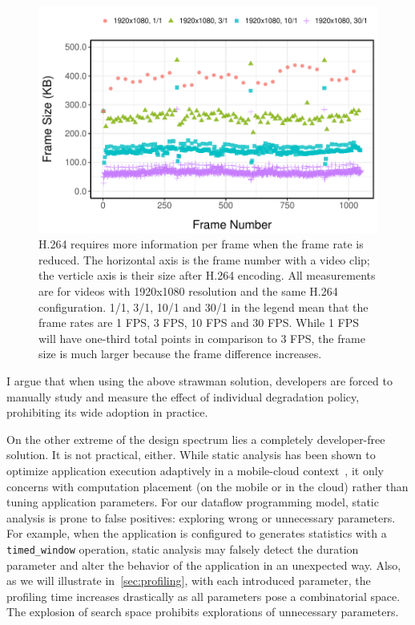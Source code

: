 \begin{figure}
  \centering
  \includegraphics[width=0.8\columnwidth]{figures/h264.pdf}
  \caption{H.264 requires more information per frame when the frame rate is
    reduced. The horizontal axis is the frame number with a video clip; the
    verticle axis is their size after H.264 encoding. All measurements are for
    videos with 1920x1080 resolution and the same H.264 configuration. 1/1, 3/1,
    10/1 and 30/1 in the legend mean that the frame rates are 1 FPS, 3 FPS, 10
    FPS and 30 FPS. While 1 FPS will have one-third total points in comparison
    to 3 FPS, the frame size is much larger because the frame difference
    increases. }
  \label{fig:h264}
\end{figure}

\vspace{0.5em}

I argue that when using the above strawman solution, developers are forced to
manually study and measure the effect of individual degradation policy,
prohibiting its wide adoption in practice.

On the other extreme of the design spectrum lies a completely developer-free
solution. It is not practical, either. While static analysis has been shown to
optimize application execution adaptively in a mobile-cloud
context~\cite{chun2011clonecloud}, it only concerns with computation placement
(on the mobile or in the cloud) rather than tuning application parameters.  For
our dataflow programming model, static analysis is prone to false positives:
exploring wrong or unnecessary parameters. For example, when the application is
configured to generates statistics with a \texttt{timed\_window} operation,
static analysis may falsely detect the duration parameter and alter the behavior
of the application in an unexpected way. Also, as we will illustrate
in~\autoref{sec:profiling}, with each introduced parameter, the profiling time
increases drastically as all parameters pose a combinatorial space. The
explosion of search space prohibits explorations of unnecessary parameters.

